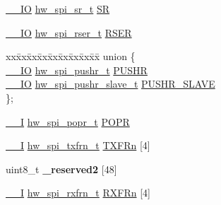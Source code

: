 \begin{DoxyCompactItemize}
\item 
\hyperlink{core__sc300_8h_aec43007d9998a0a0e01faede4133d6be}{\+\_\+\+\_\+\+IO} \hyperlink{union__hw__spi__sr}{hw\+\_\+spi\+\_\+sr\+\_\+t} \hyperlink{struct__hw__spi_ab60993cc9b7511e3d3a1138e5d0d8940}{SR}
\item 
\hyperlink{core__sc300_8h_aec43007d9998a0a0e01faede4133d6be}{\+\_\+\+\_\+\+IO} \hyperlink{union__hw__spi__rser}{hw\+\_\+spi\+\_\+rser\+\_\+t} \hyperlink{struct__hw__spi_adc7782f9d71a5e41a6628aac90593698}{R\+S\+ER}
\item 
\begin{tabbing}
xx\=xx\=xx\=xx\=xx\=xx\=xx\=xx\=xx\=\kill
union \{\\
\>\hyperlink{core__sc300_8h_aec43007d9998a0a0e01faede4133d6be}{\_\_IO} \hyperlink{union__hw__spi__pushr}{hw\_spi\_pushr\_t} \hyperlink{struct__hw__spi_adc3821caf17c9b258b57e1e8172a0698}{PUSHR}\\
\>\hyperlink{core__sc300_8h_aec43007d9998a0a0e01faede4133d6be}{\_\_IO} \hyperlink{union__hw__spi__pushr__slave}{hw\_spi\_pushr\_slave\_t} \hyperlink{struct__hw__spi_a86954e86244f3aece26c43efea1bf141}{PUSHR\_SLAVE}\\
\}; \hypertarget{struct__hw__spi_abf83145d41fd3316ce9e61eafa948579}{}\label{struct__hw__spi_abf83145d41fd3316ce9e61eafa948579}
\\

\end{tabbing}\item 
\hyperlink{core__sc300_8h_af63697ed9952cc71e1225efe205f6cd3}{\+\_\+\+\_\+I} \hyperlink{union__hw__spi__popr}{hw\+\_\+spi\+\_\+popr\+\_\+t} \hyperlink{struct__hw__spi_ab2654980b102d4bd1cf1629ea0597151}{P\+O\+PR}
\item 
\hyperlink{core__sc300_8h_af63697ed9952cc71e1225efe205f6cd3}{\+\_\+\+\_\+I} \hyperlink{union__hw__spi__txfrn}{hw\+\_\+spi\+\_\+txfrn\+\_\+t} \hyperlink{struct__hw__spi_a44831cf4455d20e48ebb4e5942582ceb}{T\+X\+F\+Rn} \mbox{[}4\mbox{]}
\item 
uint8\+\_\+t {\bfseries \+\_\+reserved2} \mbox{[}48\mbox{]}\hypertarget{struct__hw__spi_a4e7072494c64e973bf717c745769493c}{}\label{struct__hw__spi_a4e7072494c64e973bf717c745769493c}

\item 
\hyperlink{core__sc300_8h_af63697ed9952cc71e1225efe205f6cd3}{\+\_\+\+\_\+I} \hyperlink{union__hw__spi__rxfrn}{hw\+\_\+spi\+\_\+rxfrn\+\_\+t} \hyperlink{struct__hw__spi_aa7061f74ca4473dc25955d11b1b48c3b}{R\+X\+F\+Rn} \mbox{[}4\mbox{]}
\end{DoxyCompactItemize}


